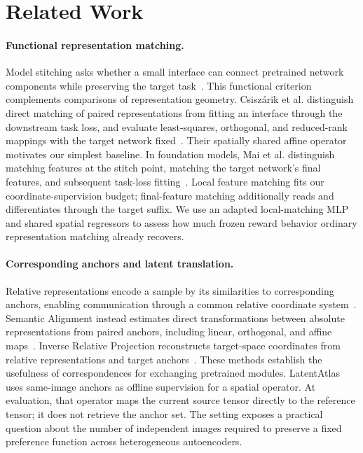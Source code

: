 \documentclass[10pt,twocolumn,letterpaper]{article}
\begin{document}
\section{Related Work}
\label{sec:related}
\paragraph{Functional representation matching.}
Model stitching asks whether a small interface can connect pretrained network components while preserving the target task~\cite{bansal2021revisiting,csiszarik2021similarity}. This functional criterion complements comparisons of representation geometry. Csisz\'{a}rik et al. distinguish direct matching of paired representations from fitting an interface through the downstream task loss, and evaluate least-squares, orthogonal, and reduced-rank mappings with the target network fixed~\cite{csiszarik2021similarity}. Their spatially shared affine operator motivates our simplest baseline. In foundation models, Mai et al. distinguish matching features at the stitch point, matching the target network's final features, and subsequent task-loss fitting~\cite{mai2026revisiting}. Local feature matching fits our coordinate-supervision budget; final-feature matching additionally reads and differentiates through the target suffix. We use an adapted local-matching MLP and shared spatial regressors to assess how much frozen reward behavior ordinary representation matching already recovers.

\paragraph{Corresponding anchors and latent translation.}
Relative representations encode a sample by its similarities to corresponding anchors, enabling communication through a common relative coordinate system~\cite{moschella2023relative}. Semantic Alignment instead estimates direct transformations between absolute representations from paired anchors, including linear, orthogonal, and affine maps~\cite{maiorca2023semantic}. Inverse Relative Projection reconstructs target-space coordinates from relative representations and target anchors~\cite{maiorca2024inverse}. These methods establish the usefulness of correspondences for exchanging pretrained modules. LatentAtlas uses same-image anchors as offline supervision for a spatial operator. At evaluation, that operator maps the current source tensor directly to the reference tensor; it does not retrieve the anchor set. The setting exposes a practical question about the number of independent images required to preserve a fixed preference function across heterogeneous autoencoders.
\end{document}
